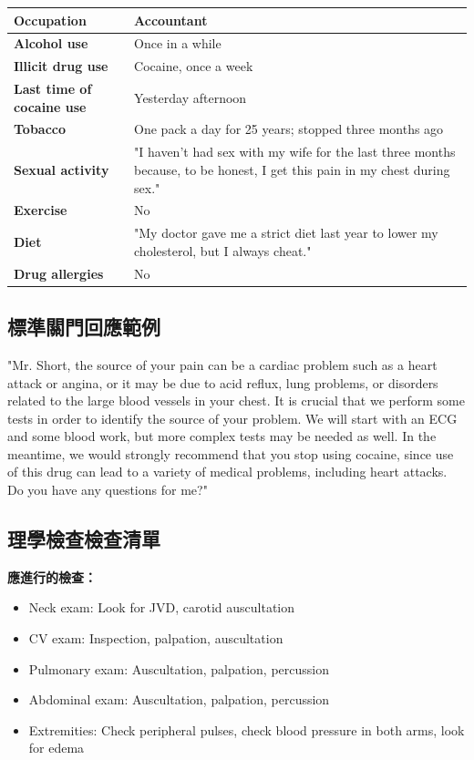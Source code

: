 \documentclass[12pt,a4paper]{article}
\begin{document}
\begin{longtable}{>{\bfseries}p{5cm}p{9cm}}
Occupation & Accountant \\
\midrule
Alcohol use & Once in a while \\
\midrule
Illicit drug use & Cocaine, once a week \\
\midrule
Last time of cocaine use & Yesterday afternoon \\
\midrule
Tobacco & One pack a day for 25 years; stopped three months ago \\
\midrule
Sexual activity & "I haven't had sex with my wife for the last three months because, to be honest, I get this pain in my chest during sex." \\
\midrule
Exercise & No \\
\midrule
Diet & "My doctor gave me a strict diet last year to lower my cholesterol, but I always cheat." \\
\midrule
Drug allergies & No \\
\bottomrule
\end{longtable}

\subsection{標準關門回應範例}

\begin{tcolorbox}[colback=highlight_yellow,colframe=emergency_blue,title=\textbf{Sample Closure}]
"Mr. Short, the source of your pain can be a cardiac problem such as a heart attack or angina, or it may be due to acid reflux, lung problems, or disorders related to the large blood vessels in your chest. It is crucial that we perform some tests in order to identify the source of your problem. We will start with an ECG and some blood work, but more complex tests may be needed as well. In the meantime, we would strongly recommend that you stop using cocaine, since use of this drug can lead to a variety of medical problems, including heart attacks. Do you have any questions for me?"
\end{tcolorbox}

\subsection{理學檢查檢查清單}

\begin{tcolorbox}[colback=emergency_gray!10!white,colframe=emergency_gray]
\textbf{應進行的檢查：}
\begin{itemize}
    \item Neck exam: Look for JVD, carotid auscultation
    \item CV exam: Inspection, palpation, auscultation
    \item Pulmonary exam: Auscultation, palpation, percussion
    \item Abdominal exam: Auscultation, palpation, percussion
    \item Extremities: Check peripheral pulses, check blood pressure in both arms, look for edema
\end{itemize}
\end{tcolorbox}
\end{document}
